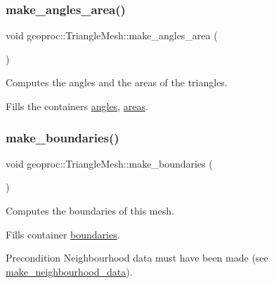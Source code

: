 \subsubsection{\texorpdfstring{make\+\_\+angles\+\_\+area()}{make\_angles\_area()}}
{\footnotesize\ttfamily void geoproc\+::\+Triangle\+Mesh\+::make\+\_\+angles\+\_\+area (\begin{DoxyParamCaption}{ }\end{DoxyParamCaption})}



Computes the angles and the areas of the triangles. 

Fills the containers \hyperlink{classgeoproc_1_1TriangleMesh_ab255af87d20d76ad84246560fa3579b3}{angles}, \hyperlink{classgeoproc_1_1TriangleMesh_a684ecaaa03f1739856bba03167e51dd1}{areas}. \mbox{\label{classgeoproc_1_1TriangleMesh_ad11c9406e2677e4d72d53837206fd769}} 
\subsubsection{\texorpdfstring{make\+\_\+boundaries()}{make\_boundaries()}}
{\footnotesize\ttfamily void geoproc\+::\+Triangle\+Mesh\+::make\+\_\+boundaries (\begin{DoxyParamCaption}{ }\end{DoxyParamCaption})}



Computes the boundaries of this mesh. 

Fills container \hyperlink{classgeoproc_1_1TriangleMesh_a57162eac37831c87786a8dab8331d72f}{boundaries}. \begin{DoxyPrecond}{Precondition}
Neighbourhood data must have been made (see \hyperlink{classgeoproc_1_1TriangleMesh_a84003dfdfd5e591c00f01a797578ff1f}{make\+\_\+neighbourhood\+\_\+data}). 
\end{DoxyPrecond}
\mbox{\label{classgeoproc_1_1TriangleMesh_a84003dfdfd5e591c00f01a797578ff1f}} 
